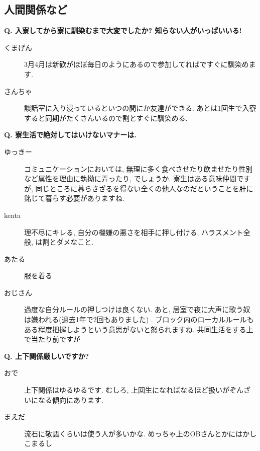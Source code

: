 \documentclass[10pt,b5jsbook,dvips,dvipdfmx,openany]{jsbook}
\theoremstyle{definition}
\begin{document}
		\subsection{人間関係など}

		\begin{multicols}{2}

		\begin{tcolorbox}
		\textbf{Q. 入寮してから寮に馴染むまで大変でしたか? 知らない人がいっぱいいる!}
		\end{tcolorbox}

		\begin{description}
		\item[くまげん] 3月4月は新歓がほぼ毎日のようにあるので参加してればですぐに馴染めます.

		\item[さんちゃ] 談話室に入り浸っているといつの間にか友達ができる. あとは1回生で入寮すると同期がたくさんいるので割とすぐに馴染める.
		\end{description}
		\begin{tcolorbox}
		\textbf{Q. 寮生活で絶対してはいけないマナーは. }
		\end{tcolorbox}

		\begin{description}
		\item[ゆっきー]
		コミュニケーションにおいては, 無理に多く食べさせたり飲ませたり性別など属性を理由に執拗に弄ったり, でしょうか. 寮生はある意味仲間ですが, 同じところに暮らさざるを得ない全くの他人なのだということを肝に銘じて暮らす必要がありますね.
		\item[kenta]
		理不尽にキレる, 自分の機嫌の悪さを相手に押し付ける, ハラスメント全般, は割とダメなこと.
		\item[あたる]
		服を着る
		\item[おじさん]
		過度な自分ルールの押しつけは良くない. あと, 居室で夜に大声に歌う奴は嫌われる(過去1年で2回もありました) . ブロック内のローカルルールもある程度把握しようという意思がないと怒られますね. 共同生活をする上で当たり前ですが
		\end{description}

		\begin{tcolorbox}
		\textbf{Q. 上下関係厳しいですか?}
		\end{tcolorbox}
		\begin{description}
		\item[おで] 上下関係はゆるゆるです. むしろ, 上回生になればなるほど扱いがぞんざいになる傾向にあります.
		\item[まえだ] 流石に敬語くらいは使う人が多いかな. めっちゃ上のOBさんとかにはかしこまるし
		\end{description}

		\end{multicols}
\end{document}
